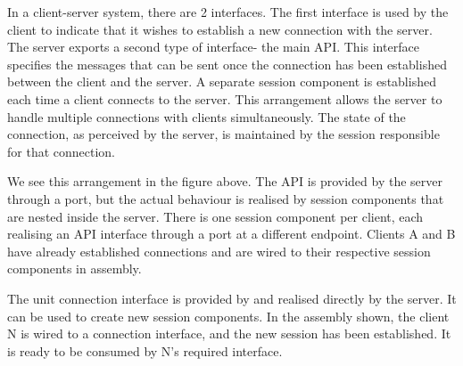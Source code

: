 \documentclass[a4paper, openany]{memoir}
\begin{document}
In a client-server system, there are 2 interfaces. The first interface is used by the client to indicate that it wishes to establish a new connection with the server. The server exports a second type of interface- the main API. This interface specifies the messages that can be sent once the connection has been established between the client and the server. A separate session component is established each time a client connects to the server. This arrangement allows the server to handle multiple connections with clients simultaneously. The state of the connection, as perceived by the server, is maintained by the session responsible for that connection. 

We see this arrangement in the figure above. The API is provided by the server through a port, but the actual behaviour is realised by session components that are nested inside the server. There is one session component per client, each realising an API interface through a port at a different endpoint. Clients A and B have already established connections and are wired to their respective session components in assembly. 

The unit connection interface is provided by and realised directly by the server. It can be used to create new session components. In the assembly shown, the client N is wired to a connection interface, and the new session has been established. It is ready to be consumed by N's required interface.
\end{document}
